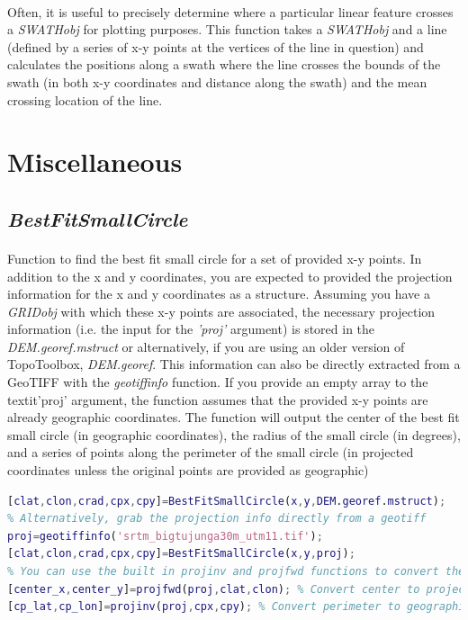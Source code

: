 \paragraph{}Often, it is useful to precisely determine where a particular linear feature crosses a \textit{SWATHobj} for plotting purposes. This function takes a \textit{SWATHobj} and a line (defined by a series of x-y points at the vertices of the line in question) and calculates the positions along a swath where the line crosses the bounds of the swath (in both x-y coordinates and distance along the swath) and the mean crossing location of the line. 

\section{Miscellaneous}

\subsection{\textit{BestFitSmallCircle}} \label{sec:SmallCirc}
\paragraph{}Function to find the best fit small circle for a set of provided x-y points. In addition to the x and y coordinates, you are expected to provided the projection information for the x and y coordinates as a structure. Assuming you have a \textit{GRIDobj} with which these x-y points are associated, the necessary projection information (i.e. the input for the \textit{'proj'} argument) is stored in the \textit{DEM.georef.mstruct} or alternatively, if you are using an older version of TopoToolbox, \textit{DEM.georef}. This information can also be directly extracted from a GeoTIFF with the \textit{geotiffinfo} function. If you provide an empty array to the textit{'proj'} argument, the function assumes that the provided x-y points are already geographic coordinates. The function will output the center of the best fit small circle (in geographic coordinates), the radius of the small circle (in degrees), and a series of points along the perimeter of the small circle (in projected coordinates unless the original points are provided as geographic)

\begin{lstlisting}[language=Matlab]
% Produce a best fit small circle from a series of x and y coordinates extracted from a particular DEM
[clat,clon,crad,cpx,cpy]=BestFitSmallCircle(x,y,DEM.georef.mstruct);
% Alternatively, grab the projection info directly from a geotiff
proj=geotiffinfo('srtm_bigtujunga30m_utm11.tif');
[clat,clon,crad,cpx,cpy]=BestFitSmallCircle(x,y,proj);
% You can use the built in projinv and projfwd functions to convert the clat and clon or cpx and cpy outputs
[center_x,center_y]=projfwd(proj,clat,clon); % Convert center to projected
[cp_lat,cp_lon]=projinv(proj,cpx,cpy); % Convert perimeter to geographic
\end{lstlisting}

